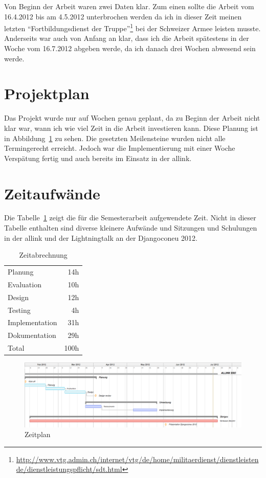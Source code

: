 Von Beginn der Arbeit waren zwei Daten klar. Zum einen sollte die Arbeit vom 16.4.2012 bis am 4.5.2012 unterbrochen werden da ich in dieser Zeit meinen letzten ``Fortbildungsdienst der Truppe''\footnote{\url{http://www.vtg.admin.ch/internet/vtg/de/home/militaerdienst/dienstleistende/dienstleistungspflicht/sdt.html}} bei der Schweizer Armee leisten musste. Anderseits war auch von Anfang an klar, dass ich die Arbeit spätestens in der Woche vom 16.7.2012 abgeben werde, da ich danach drei Wochen abwesend sein werde.

\section{Projektplan}
\label{sec:projektplan}
Das Projekt wurde nur auf Wochen genau geplant, da zu Beginn der Arbeit nicht klar war, wann ich wie viel Zeit in die Arbeit investieren kann. Diese Planung ist in Abbildung~\ref{fig:zeitplan} zu sehen. Die gesetzten Meilensteine wurden nicht alle Termingerecht erreicht. Jedoch war die Implementierung mit einer Woche Verspätung fertig und auch bereits im Einsatz in der allink.

\section{Zeitaufwände}
\label{sec:zeitaufwände}
Die Tabelle~\ref{tab:zeitabrechnung} zeigt die für die Semesterarbeit aufgewendete Zeit. Nicht in dieser Tabelle enthalten sind diverse kleinere Aufwände und Sitzungen und Schulungen in der allink und der Lightningtalk an der Djangoconeu 2012.
\begin{table}[ht]
  \centering
  \begin{tabular}{lr}
    Planung & 14h \\
    Evaluation & 10h \\
    Design & 12h \\
    Testing & 4h \\
    Implementation & 31h \\
    Dokumentation & 29h \\
    \hline
    Total & 100h \\
  \end{tabular}
  \caption{Zeitabrechnung}
  \label{tab:zeitabrechnung}
\end{table}

\begin{figure}
  \centering
	\includegraphics[width=21cm, angle=90]{include/zeitplan.png}
	\caption{Zeitplan}
	\label{fig:zeitplan}
\end{figure}
